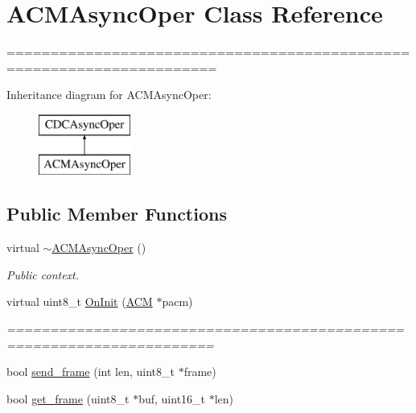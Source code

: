\hypertarget{class_a_c_m_async_oper}{\section{\-A\-C\-M\-Async\-Oper \-Class \-Reference}
\label{class_a_c_m_async_oper}
}


======================================================================  


\-Inheritance diagram for \-A\-C\-M\-Async\-Oper\-:\begin{figure}[H]
\begin{center}
\leavevmode
\includegraphics[height=2.000000cm]{class_a_c_m_async_oper}
\end{center}
\end{figure}
\subsection*{\-Public \-Member \-Functions}
\begin{DoxyCompactItemize}
\item 
virtual \hyperlink{class_a_c_m_async_oper_a7713be3d35aeb18cdce534f4f317e967}{$\sim$\-A\-C\-M\-Async\-Oper} ()
\begin{DoxyCompactList}\small\item\em \-Public context. \end{DoxyCompactList}\item 
virtual uint8\-\_\-t \hyperlink{class_a_c_m_async_oper_af3e9315952212775f90eb3ccfff168c8}{\-On\-Init} (\hyperlink{class_a_c_m}{\-A\-C\-M} $\ast$pacm)
\begin{DoxyCompactList}\small\item\em ====================================================================== \end{DoxyCompactList}\item 
bool \hyperlink{class_a_c_m_async_oper_a1495b1aa9969eeb0f6bc286c19c17606}{send\-\_\-frame} (int len, uint8\-\_\-t $\ast$frame)
\item 
bool \hyperlink{class_a_c_m_async_oper_a4088870a98b79011b3b8a7dd0028144c}{get\-\_\-frame} (uint8\-\_\-t $\ast$buf, uint16\-\_\-t $\ast$len)
\end{DoxyCompactItemize}


